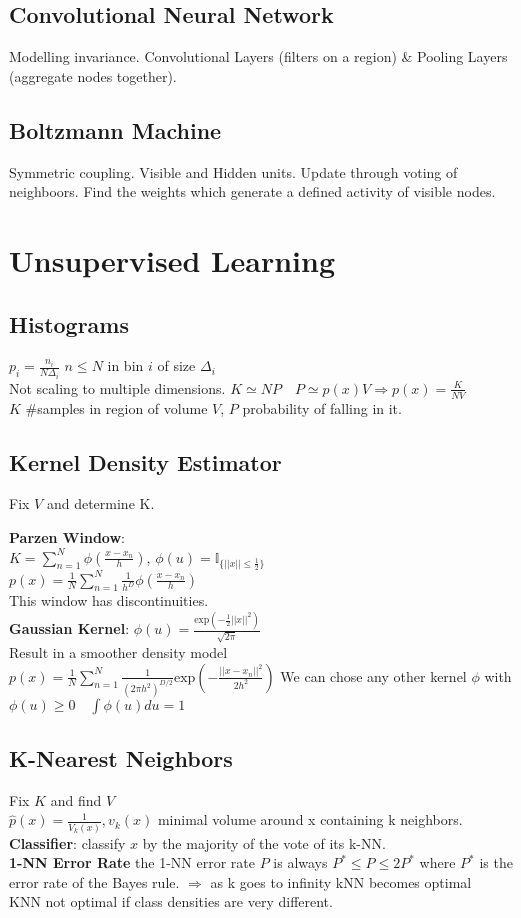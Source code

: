 \subsection*{Convolutional Neural Network}
Modelling invariance.
Convolutional Layers (filters on a region) \& Pooling Layers (aggregate nodes together).

\subsection*{Boltzmann Machine}
Symmetric coupling. Visible and Hidden units. Update through voting of neighboors. Find the weights which generate a defined activity of visible nodes.

\section*{Unsupervised Learning}
\subsection*{Histograms}
$p_i = \frac{n_i}{N\Delta_i}$ $n\leq N$ in bin $i$ of size $\Delta_i$\\
Not scaling to multiple dimensions.
$K\simeq NP\quad P\simeq p(x)V \Rightarrow p(x) = \frac{K}{NV}$\\
$K$ \#samples in region of volume $V$, $P$ probability of falling in it. 
\subsection*{Kernel Density Estimator}
Fix $V$ and determine K.

\textbf{Parzen Window}:\\ $K=\sum_{n=1}^N\phi(\frac{x-x_n}{h})$, 
$ \phi(u)= \mathbb{I}_{\{||x||\leq\frac{1}{2}\}}$\\
$p(x)=\frac{1}{N}\sum_{n=1}^N\frac{1}{h^D}\phi(\frac{x-x_n}{h})$\\
This window has discontinuities.\\
\textbf{Gaussian Kernel}: 
$ \phi(u){=} \frac{\mathrm{exp}({-}\frac{1}{2}||x||^2)}{\sqrt{2\pi}}$\\
Result in a smoother density model\\
$p(x)=\frac{1}{N}\sum_{n=1}^N\frac{1}{(2\pi h^2)^{D/2}}\mathrm{exp}(-\frac{||x-x_n||^2}{2h^2})$
We can chose any other kernel $\phi$ with $\phi(u)\geq0\quad\int\phi(u)du=1$

\subsection*{K-Nearest Neighbors}
Fix $K$ and find $V$\\
$\hat{p}(x)=\frac{1}{V_k(x)}, v_k(x)$ minimal volume around x containing k neighbors.\\
\textbf{Classifier}: classify $x$ by the majority of the vote of its k-NN.\\
\textbf{1-NN Error Rate}
the 1-NN error rate $P$ is always $P^*\leq P\leq 2P^*$ where $P^*$ is the error rate of the Bayes rule.
$\Rightarrow$ as k goes to infinity kNN becomes optimal\\
KNN not optimal if class densities are very different.
